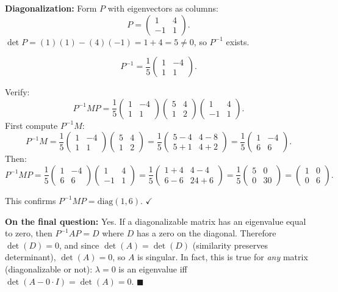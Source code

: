 \documentclass[12pt]{article}
\begin{document}
\medskip
\textbf{Diagonalization:} Form $P$ with eigenvectors as columns:
\[
P = \begin{pmatrix} 1 & 4 \\ -1 & 1 \end{pmatrix}.
\]
$\det P = (1)(1) - (4)(-1) = 1 + 4 = 5 \neq 0$, so $P^{-1}$ exists.

\[
P^{-1} = \frac{1}{5}\begin{pmatrix} 1 & -4 \\ 1 & 1 \end{pmatrix}.
\]

Verify:
\[
P^{-1}MP = \frac{1}{5}\begin{pmatrix} 1 & -4 \\ 1 & 1 \end{pmatrix}\begin{pmatrix} 5 & 4 \\ 1 & 2 \end{pmatrix}\begin{pmatrix} 1 & 4 \\ -1 & 1 \end{pmatrix}.
\]
First compute $P^{-1}M$:
\[
P^{-1}M = \frac{1}{5}\begin{pmatrix} 1 & -4 \\ 1 & 1 \end{pmatrix}\begin{pmatrix} 5 & 4 \\ 1 & 2 \end{pmatrix} = \frac{1}{5}\begin{pmatrix} 5-4 & 4-8 \\ 5+1 & 4+2 \end{pmatrix} = \frac{1}{5}\begin{pmatrix} 1 & -4 \\ 6 & 6 \end{pmatrix}.
\]
Then:
\[
P^{-1}MP = \frac{1}{5}\begin{pmatrix} 1 & -4 \\ 6 & 6 \end{pmatrix}\begin{pmatrix} 1 & 4 \\ -1 & 1 \end{pmatrix} = \frac{1}{5}\begin{pmatrix} 1+4 & 4-4 \\ 6-6 & 24+6 \end{pmatrix} = \frac{1}{5}\begin{pmatrix} 5 & 0 \\ 0 & 30 \end{pmatrix} = \begin{pmatrix} 1 & 0 \\ 0 & 6 \end{pmatrix}.
\]

This confirms $P^{-1}MP = \text{diag}(1, 6)$. $\checkmark$

\medskip
\textbf{On the final question:} Yes. If a diagonalizable matrix has an eigenvalue equal to zero, then $P^{-1}AP = D$ where $D$ has a zero on the diagonal. Therefore $\det(D) = 0$, and since $\det(A) = \det(D)$ (similarity preserves determinant), $\det(A) = 0$, so $A$ is singular. In fact, this is true for \emph{any} matrix (diagonalizable or not): $\lambda = 0$ is an eigenvalue iff $\det(A - 0 \cdot I) = \det(A) = 0$. \hfill $\blacksquare$
\end{document}
